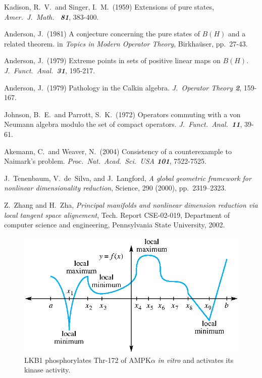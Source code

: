 \documentclass{pnastwo}
\begin{document}
\begin{article}
\begin{thebibliography}{10}
Kadison, R.\ V.\ and Singer, I.\ M.\ (1959)
Extensions of pure states, {\it Amer.\ J.\ Math.\ \bf
81}, 383-400.

Anderson, J.\ (1981) A conjecture concerning the pure states of
$B(H)$ and a related theorem. in {\it Topics in Modern Operator
Theory}, Birkha\"user, pp.\ 27-43.

Anderson, J.\ (1979) Extreme points in sets of
positive linear maps on $B(H)$. {\it J.\ Funct.\
Anal.\
\bf 31}, 195-217.

Anderson, J.\ (1979) Pathology in the Calkin algebra. {\it J.\
Operator Theory \bf 2}, 159-167.

\bibitem{5}
Johnson, B.\ E.\ and Parrott, S.\ K.\ (1972) Operators commuting
with a von Neumann algebra modulo the set of compact operators.
{\it J.\ Funct.\ Anal.\ \bf 11}, 39-61.

\bibitem{6}
Akemann, C.\ and Weaver, N.\ (2004) Consistency of a
counterexample to Naimark's problem. {\it Proc.\ Nat.\ Acad.\
Sci.\ USA \bf 101}, 7522-7525.

\bibitem{TSL}
J.~Tenenbaum, V.~de~Silva, and J.~Langford, {\em A global geometric
  framework for nonlinear dimensionality reduction}, Science, 290 (2000),
  pp.~2319--2323.

\bibitem{ZhaZha}
Z.~Zhang and H.~Zha, {\em Principal manifolds and nonlinear dimension
  reduction via local tangent space alignement}, Tech. Report CSE-02-019,
  Department of computer science and engineering, Pennsylvania State
  University, 2002.
\end{thebibliography}
\end{article}

\begin{figure}
\centerline{\includegraphics[width=.4\textwidth]{figsamp.eps}}
\caption{LKB1 phosphorylates Thr-172 of AMPK$\alpha$ \textit{in vitro}
and activates its kinase activity.}\label{afoto}
\end{figure}
\end{document}
